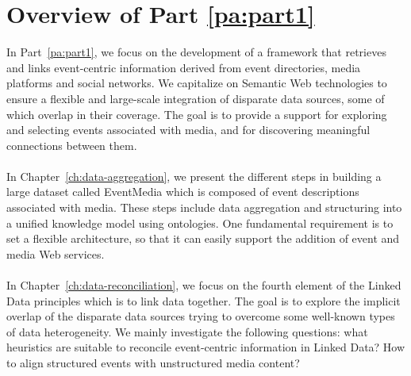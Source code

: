 \chapter*{Overview of Part \ref{pa:part1}}

In Part~\ref{pa:part1}, we focus on the development of a framework that retrieves and links event-centric information derived from event directories, media platforms and social networks. We capitalize on Semantic Web technologies to ensure a flexible and large-scale integration of disparate data sources, some of which overlap in their coverage. The goal is to provide a support for exploring and selecting events associated with media, and for discovering meaningful connections between them. 
\\
\\
In Chapter~\ref{ch:data-aggregation}, we present the different steps in building a large dataset called EventMedia which is composed of event descriptions associated with media. These steps include data aggregation and structuring into a unified knowledge model using ontologies. One fundamental requirement is to set a flexible architecture, so that it can easily support the addition of event and media Web services.
\\
\\
In Chapter~\ref{ch:data-reconciliation}, we focus on the fourth element of the Linked Data principles which is to link data together. The goal is to explore the implicit overlap of the disparate data sources trying to overcome some well-known types of data heterogeneity. We mainly investigate the following questions: what heuristics are suitable to reconcile event-centric information in Linked Data? How to align structured events with unstructured media content? 